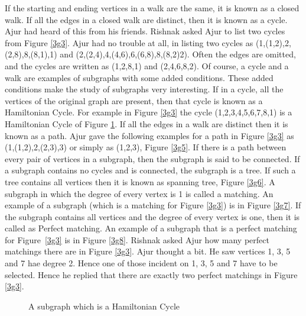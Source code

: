 If the starting and ending vertices in a walk are the same, it is known as a closed walk. If all the edges in a closed walk are distinct, then it is known as a cycle. 
Ajur had heard of this from his friends.
Rishnak asked Ajur to list two cycles from Figure \ref{3g3}. Ajur had no trouble at all, in listing two cycles as (1,(1,2),2,(2,8),8,(8,1),1) and (2,(2,4),4,(4,6),6,(6,8),8,(8,2)2). Often the edges are omitted, and the cycles are written as (1,2,8,1) and (2,4,6,8,2).  Of course, a cycle and a walk are examples of subgraphs with some added conditions. These added conditions make the study of subgraphs very interesting. If in a cycle, all the vertices of the original graph are present, then that cycle is known as a Hamiltonian Cycle. For example in Figure \ref{3g3} the cycle (1,2,3,4,5,6,7,8,1) is a Hamiltonian Cycle of Figure \ref{3g4}. If all the edges in a walk are distinct then it is known as a path. Ajur gave the following examples for a path in Figure \ref{3g3} as (1,(1,2),2,(2,3),3) or simply as (1,2,3), Figure \ref{3g5}. If there is a path between every pair of vertices in a subgraph, then the subgraph is said to be connected. If a subgraph contains no cycles and is connected, the subgraph is a tree. If such a tree contains all vertices then it is known as spanning tree, Figure \ref{3g6}.  A subgraph in which the degree of every vertex is 1 is called a matching. An example of a subgraph (which is a matching for Figure \ref{3g3}) is in Figure \ref{3g7}. If the subgraph contains all vertices and the degree of every vertex is one, then it is called as Perfect matching. An example of a subgraph that is a perfect matching for Figure~\ref{3g3} is in Figure \ref{3g8}. Rishnak asked Ajur how many perfect matchings there are in Figure \ref{3g3}. Ajur thought a bit. He saw vertices 1, 3, 5 and 7 hae degree 2. Hence one of those incident on 1, 3, 5 and 7 have to be selected. Hence he replied that there are exactly two perfect matchings in Figure \ref{3g3}. 
\\
\begin{figure}
\begin{center}
\caption{ A subgraph which is a Hamiltonian Cycle}\label{3g4}
\end{center}
\end{figure}

